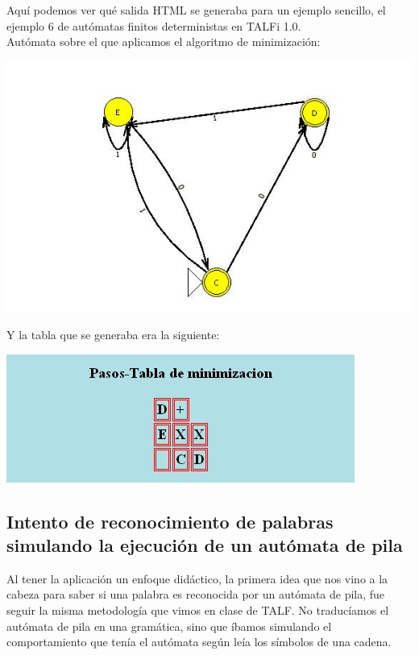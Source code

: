 \documentclass[12pt,a4paper,spanish]{book}
\begin{document}
Aqu\'i podemos ver qu\'e salida HTML se generaba para un ejemplo sencillo, el ejemplo 6 de aut\'omatas finitos deterministas en TALFi 1.0.\\ \newline \newline \newline \newline \newline \newline
Aut\'omata sobre el que aplicamos el algoritmo de minimizaci\'on:
\begin{center}
\includegraphics[width=\textwidth]{autminiantigua.jpg}\\
\end{center}

Y la tabla que se generaba era la siguiente:
\begin{center}
\includegraphics{pasosminiantigua.jpg}
\end{center}

\subsection{Intento de reconocimiento de palabras simulando la ejecuci\'on de un aut\'omata de pila\\}
Al tener la aplicaci\'on un enfoque did\'actico, la primera idea que nos vino a la cabeza para saber si una palabra es reconocida por un aut\'omata de pila, fue seguir la misma metodolog\'ia que vimos en clase de TALF. No traduc\'iamos el aut\'omata de pila en una gram\'atica, sino que \'ibamos simulando el comportamiento que ten\'ia el aut\'omata seg\'un le\'ia los s\'imbolos de una cadena.\\
\end{document}
